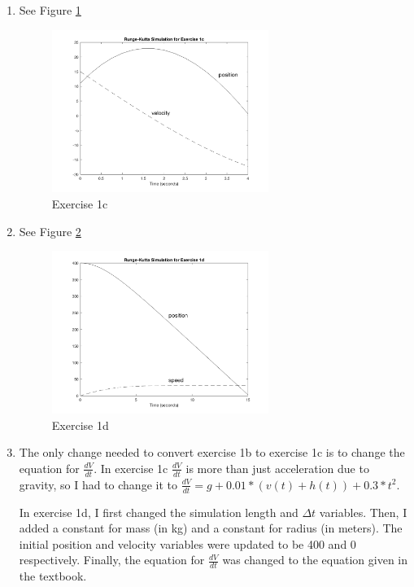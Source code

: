 \documentclass[12pt]{article}
\begin{document}
\begin{enumerate}
\begin{enumerate}
    \item
    	See Figure \ref{fig:1c-1}
    	\begin{figure}[h!]
  			\includegraphics[width=0.666\textwidth]{1c-1}
  			\centering
        \caption{Exercise 1c}
        \label{fig:1c-1}
      \end{figure}
      
     \item
    	 See Figure \ref{fig:1d-1}
    	 \begin{figure}[h!]
  			 \includegraphics[width=0.666\textwidth]{1d-1}
  			 \centering
         \caption{Exercise 1d}
         \label{fig:1d-1}
       \end{figure}
      
     \item
       The only change needed to convert exercise 1b to exercise 1c is to change the equation for $\frac{dV}{dt}$. In exercise 1c $\frac{dV}{dt}$ is more than just acceleration due to gravity, so I had to change it to $\frac{dV}{dt} = g + 0.01 * (v(t) + h(t)) + 0.3 * t^2$.
       
       In exercise 1d, I first changed the simulation length and $\Delta t$ variables. Then, I added a constant for mass (in kg) and a constant for radius (in meters). The initial position and velocity variables were updated to be 400 and 0 respectively. Finally, the equation for $\frac{dV}{dt}$ was changed to the equation given in the textbook.
       

\end{enumerate}
\end{enumerate}
\end{document}
